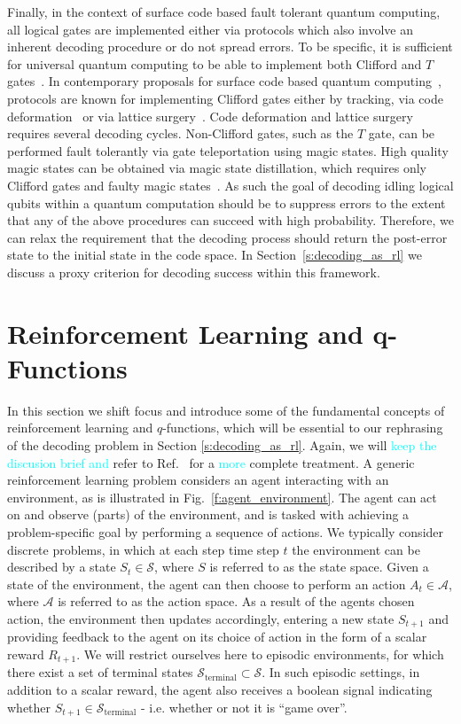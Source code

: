\documentclass[twocolumn,preprintnumbers,amsmath,amssymb,notitlepage,nofootinbib,longbibliography,superscriptaddress,aps,pra,10pt]{revtex4-1}
\newcommand{\je}[1]{\textcolor{cyan}{#1}}
\begin{document}
	Finally, in the context of surface code based fault tolerant quantum computing, all logical gates are implemented either via protocols which also involve an inherent decoding procedure or do not spread errors.
	To be specific, it is sufficient for universal quantum computing to be able to implement both Clifford and $T$ gates~\cite{Nebe01,Bravyi05}.
	In contemporary proposals for surface code based quantum computing~\cite{Litinski18b,Fowler18},
	protocols are known for implementing Clifford gates either by tracking, via code deformation~\cite{Brown17} or via lattice surgery~\cite{Horsman12,Litinski18}.
	Code deformation and lattice surgery requires several decoding cycles.
	Non-Clifford gates, such as the $T$ gate, can be performed fault tolerantly via gate teleportation using magic states.
	High quality magic states can be obtained via magic state distillation, which requires only Clifford gates and faulty magic states~\cite{Bravyi05}.
	As such the goal of decoding idling logical qubits within a quantum computation should be to suppress errors to the extent that any of the above procedures can succeed with high probability.
	Therefore, we can relax the requirement that the decoding process should return the post-error state to the initial state in the code space.
	In Section~\ref{s:decoding_as_rl} we discuss a proxy criterion for decoding success within this framework.

\section{Reinforcement Learning and q-Functions}\label{s:reinforcement_learning}

	In this section we shift focus and introduce some of the fundamental concepts of reinforcement learning and $q$-functions, which will be essential to our rephrasing of the decoding problem in Section \ref{s:decoding_as_rl}.
	Again, we will %
	\je{keep the discusion brief and} refer to Ref.\ \cite{RLSutton18} for a \je{more} complete treatment.
	A generic reinforcement learning problem considers an agent interacting with an environment, as is illustrated in Fig.\ \ref{f:agent_environment}.
	The agent can act on and observe (parts) of the environment, and is tasked with achieving a problem-specific goal by performing a sequence of actions.
	We typically consider discrete problems, in  which at each step time step $t$ the environment can be described by a state $S_t \in \mathcal{S}$, where $S$ is referred to as the state space.
	Given a state of the environment, the agent can then choose to perform an action $A_t \in \mathcal{A}$, where $\mathcal{A}$ is referred to as the action space.
	As a result of the agents chosen action, the environment then updates accordingly, entering a new state $S_{t+1}$ and providing feedback to the agent on its choice of action in the form of a scalar reward $R_{t+1}$.
	We will restrict ourselves here to episodic environments, for which there exist a set of terminal states $\mathcal{S}_{\mathrm{terminal}} \subset \mathcal{S}$.
	In such episodic settings, in addition to a scalar reward, the agent also receives a boolean signal indicating whether $S_{t+1} \in \mathcal{S}_{\mathrm{terminal}} $ - i.e. whether or not it is ``game over''.
\end{document}
